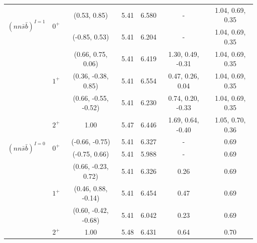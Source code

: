 \documentclass[prd,twocolumn,floatfix,nofootinbib]{revtex4}
\begin{document}
\begin{table}[!htbp]
\begin{tabular}{ccccccc}
        \multirow{2}{*}{${(nn\bar{s}\bar{b})}^{I=1}$}
                        &\multirow{2}{*}{$0^{+}$}
                                    &(0.53, 0.85)           &5.41	    &6.580	    &-                      &1.04, 0.69, 0.35 \\ 
                        &           &(-0.85, 0.53)          &5.41	    &6.204	    &-                      &1.04, 0.69, 0.35 \\ 
                        &\multirow{3}{*}{$1^{+}$}
                                    &(0.66, 0.75, 0.06)     &5.41	    &6.419	    &1.30, 0.49, -0.31      &1.04, 0.69, 0.35 \\ 
                        &           &(0.36, -0.38, 0.85)    &5.41	    &6.554	    &0.47, 0.26, 0.04       &1.04, 0.69, 0.35 \\ 
                        &           &(0.66, -0.55, -0.52)   &5.41	    &6.230	    &0.74, 0.20, -0.33      &1.04, 0.69, 0.35 \\ 
                        &$2^{+}$    &1.00                   &5.47	    &6.446	    &1.69, 0.64, -0.40      &1.05, 0.70, 0.36 \\ 
        \multirow{2}{*}{${(nn\bar{s}\bar{b})}^{I=0}$}
                        &\multirow{2}{*}{$0^{+}$}
                                    &(-0.66, -0.75)         &5.41	    &6.327	    &-                      &0.69 \\ 
                        &           &(-0.75, 0.66)          &5.41	    &5.988	    &-                      &0.69 \\ 
                        &\multirow{3}{*}{$1^{+}$}                            
                                    &(0.66, -0.23, 0.72)    &5.41	    &6.326	    &0.26                   &0.69 \\ 
                        &           &(0.46, 0.88, -0.14)    &5.41	    &6.454	    &0.47                   &0.69 \\ 
                        &           &(0.60, -0.42, -0.68)   &5.41	    &6.042	    &0.23                   &0.69 \\ 
                        &$2^{+}$    &1.00                   &5.48	    &6.431	    &0.64                   &0.70 \\ 
        \hline\hline
    \end{tabular}
\end{table}
\end{document}
